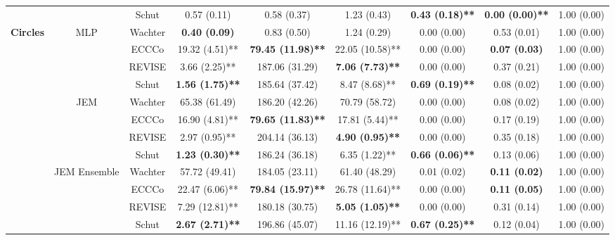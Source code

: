 \begin{table}
{\begin{tabular}[t]{>{}c|c|c|c|c|c|c|c|c}
 &  & Schut & 0.57 (0.11) & 0.58 (0.37) & 1.23 (0.43) & \textbf{0.43 (0.18)**} & \textbf{0.00 (0.00)**} & 1.00 (0.00)\\

\multirow{-12}{*}{\centering\arraybackslash \textbf{Circles}} & \multirow{-6}{*}{\centering\arraybackslash MLP} & Wachter & \textbf{0.40 (0.09)} & 0.83 (0.50) & 1.24 (0.29) & 0.00 (0.00) & 0.53 (0.01) & 1.00 (0.00)\\
\cline{1-9}
 &  & ECCCo & 19.32 (4.51)** & \textbf{79.45 (11.98)**} & 22.05 (10.58)** & 0.00 (0.00) & \textbf{0.07 (0.03)} & 1.00 (0.00)\\

 &  & REVISE & 3.66 (2.25)** & 187.06 (31.29) & \textbf{7.06 (7.73)**} & 0.00 (0.00) & 0.37 (0.21) & 1.00 (0.00)\\

 &  & Schut & \textbf{1.56 (1.75)**} & 185.64 (37.42) & 8.47 (8.68)** & \textbf{0.69 (0.19)**} & 0.08 (0.02) & 1.00 (0.00)\\

 & \multirow{-4}{*}{\centering\arraybackslash JEM} & Wachter & 65.38 (61.49) & 186.20 (42.26) & 70.79 (58.72) & 0.00 (0.00) & 0.08 (0.02) & 1.00 (0.00)\\
\cline{2-9}
 &  & ECCCo & 16.90 (4.81)** & \textbf{79.65 (11.83)**} & 17.81 (5.44)** & 0.00 (0.00) & 0.17 (0.19) & 1.00 (0.00)\\

 &  & REVISE & 2.97 (0.95)** & 204.14 (36.13) & \textbf{4.90 (0.95)**} & 0.00 (0.00) & 0.35 (0.18) & 1.00 (0.00)\\

 &  & Schut & \textbf{1.23 (0.30)**} & 186.24 (36.18) & 6.35 (1.22)** & \textbf{0.66 (0.06)**} & 0.13 (0.06) & 1.00 (0.00)\\

 & \multirow{-4}{*}{\centering\arraybackslash JEM Ensemble} & Wachter & 57.72 (49.41) & 184.05 (23.11) & 61.40 (48.29) & 0.01 (0.02) & \textbf{0.11 (0.02)} & 1.00 (0.00)\\
\cline{2-9}
 &  & ECCCo & 22.47 (6.06)** & \textbf{79.84 (15.97)**} & 26.78 (11.64)** & 0.00 (0.00) & \textbf{0.11 (0.05)} & 1.00 (0.00)\\

 &  & REVISE & 7.29 (12.81)** & 180.18 (30.75) & \textbf{5.05 (1.05)**} & 0.00 (0.00) & 0.31 (0.14) & 1.00 (0.00)\\

 &  & Schut & \textbf{2.67 (2.71)**} & 196.86 (45.07) & 11.16 (12.19)** & \textbf{0.67 (0.25)**} & 0.12 (0.04) & 1.00 (0.00)\\


\end{tabular}}
\end{table}
